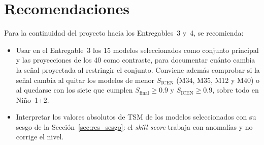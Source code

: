 \documentclass[11pt,a4paper]{article}
\begin{document}
\section{Recomendaciones}
\label{sec:recomendaciones}

Para la continuidad del proyecto hacia los Entregables~3 y~4, se recomienda:

\begin{itemize}
\item Usar en el Entregable~3 los 15 modelos seleccionados como conjunto principal y las proyecciones de los 40 como contraste, para documentar cuánto cambia la señal proyectada al restringir el conjunto. Conviene además comprobar si la señal cambia al quitar los modelos de menor $S_{\mathrm{ICEN}}$ (M34, M35, M12 y M40) o al quedarse con los siete que cumplen $S_{\mathrm{final}} \geq 0.9$ y $S_{\mathrm{ICEN}} \geq 0.9$, sobre todo en Niño~1+2.
\item Interpretar los valores absolutos de TSM de los modelos seleccionados con su sesgo de la Sección~\ref{sec:res_sesgo}: el \emph{skill score} trabaja con anomalías y no corrige el nivel.
\end{itemize}



\end{document}
